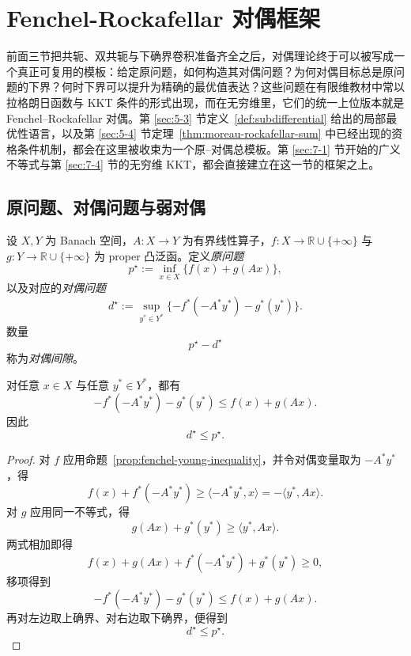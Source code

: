 \section{Fenchel-Rockafellar 对偶框架}

\label{sec:6-4}

前面三节把共轭、双共轭与下确界卷积准备齐全之后，对偶理论终于可以被写成一个真正可复用的模板：给定原问题，如何构造其对偶问题？为何对偶目标总是原问题的下界？何时下界可以提升为精确的最优值表达？这些问题在有限维教材中常以拉格朗日函数与 KKT 条件的形式出现，而在无穷维里，它们的统一上位版本就是 Fenchel--Rockafellar 对偶。第 \ref{sec:5-3} 节定义~\ref{def:subdifferential} 给出的局部最优性语言，以及第 \ref{sec:5-4} 节定理~\ref{thm:moreau-rockafellar-sum} 中已经出现的资格条件机制，都会在这里被收束为一个原--对偶总模板。第 \ref{sec:7-1} 节开始的广义不等式与第 \ref{sec:7-4} 节的无穷维 KKT，都会直接建立在这一节的框架之上。

\subsection{原问题、对偶问题与弱对偶}

\begin{definition}\label{def:fenchel-primal-dual-pair}
设 $X,Y$ 为 Banach 空间，$A\colon X\to Y$ 为有界线性算子，$f\colon X\to \mathbb R\cup\{+\infty\}$ 与 $g\colon Y\to \mathbb R\cup\{+\infty\}$ 为 proper 凸泛函。定义\emph{原问题}
\[
p^\star:=\inf_{x\in X}\{f(x)+g(Ax)\},
\]
以及对应的\emph{对偶问题}
\[
d^\star:=\sup_{y^\ast\in Y^\ast}\{-f^\ast(-A^\ast y^\ast)-g^\ast(y^\ast)\}.
\]
数量
\[
p^\star-d^\star
\]
称为\emph{对偶间隙}。
\end{definition}

\begin{proposition}[弱对偶]\label{prop:fenchel-weak-duality}
对任意 $x\in X$ 与任意 $y^\ast\in Y^\ast$，都有
\[
-f^\ast(-A^\ast y^\ast)-g^\ast(y^\ast)\le f(x)+g(Ax).
\]
因此
\[
d^\star\le p^\star.
\]
\end{proposition}

\begin{proof}
对 $f$ 应用命题~\ref{prop:fenchel-young-inequality}，并令对偶变量取为 $-A^\ast y^\ast$，得
\[
f(x)+f^\ast(-A^\ast y^\ast)\ge \langle -A^\ast y^\ast,x\rangle=-\langle y^\ast,Ax\rangle.
\]
对 $g$ 应用同一不等式，得
\[
g(Ax)+g^\ast(y^\ast)\ge \langle y^\ast,Ax\rangle.
\]
两式相加即得
\[
f(x)+g(Ax)+f^\ast(-A^\ast y^\ast)+g^\ast(y^\ast)\ge 0,
\]
移项得到
\[
-f^\ast(-A^\ast y^\ast)-g^\ast(y^\ast)\le f(x)+g(Ax).
\]
再对左边取上确界、对右边取下确界，便得到
\[
d^\star\le p^\star.
\]
\end{proof}

